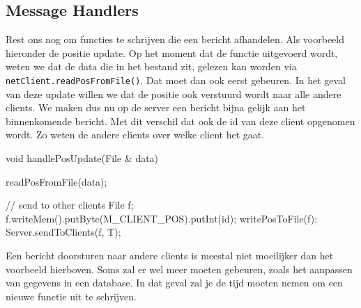\subsection{Message Handlers}
Rest ons nog om functies te schrijven die een bericht afhandelen. Als voorbeeld hieronder de positie update. Op het moment dat de functie uitgevoerd wordt, weten we dat de data die in het bestand zit, gelezen kan worden via \texttt{netClient.readPosFromFile()}. Dat moet dan ook eerst gebeuren. In het geval van deze update willen we dat de positie ook verstuurd wordt naar alle andere clients. We maken dus nu op de server een bericht bijna gelijk aan het binnenkomende bericht. Met dit verschil dat ook de id van deze client opgenomen wordt. Zo weten de andere clients over welke client het gaat.

\begin{code}
void handlePosUpdate(File & data)
{
	readPosFromFile(data);
	
	// send to other clients
	File f;
	f.writeMem().putByte(M_CLIENT_POS).putInt(id);
	writePosToFile(f);
	Server.sendToClients(f, T);
}
\end{code}

Een bericht doorsturen naar andere clients is meestal niet moeilijker dan het voorbeeld hierboven. Soms zal er wel meer moeten gebeuren, zoals het aanpassen van gegevens in een database. In dat geval zal je de tijd moeten nemen om een nieuwe functie uit te schrijven.



 